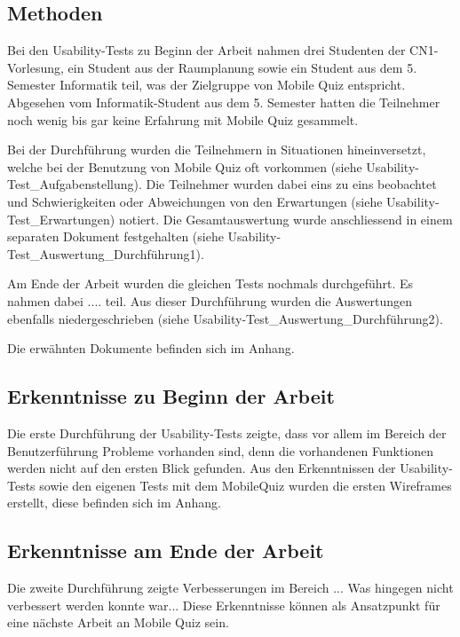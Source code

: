 \subsection{Methoden}
Bei den \gls{Usability-Tests} zu Beginn der Arbeit nahmen drei Studenten der \acrfull{CN1}-Vorlesung, ein Student aus der Raumplanung sowie ein Student aus dem 5. Semester Informatik teil, was der Zielgruppe von Mobile Quiz entspricht. Abgesehen vom Informatik-Student aus dem 5. Semester hatten die Teilnehmer noch wenig bis gar keine Erfahrung mit Mobile Quiz gesammelt.

Bei der Durchführung wurden die Teilnehmern in Situationen hineinversetzt, welche bei der Benutzung von Mobile Quiz oft vorkommen (siehe Usability-Test\_Aufgabenstellung). Die Teilnehmer wurden dabei eins zu eins beobachtet und Schwierigkeiten oder Abweichungen von den Erwartungen (siehe Usability-Test\_Erwartungen) notiert. Die Gesamtauswertung wurde anschliessend in einem separaten Dokument festgehalten (siehe Usability-Test\_Auswertung\_Durchführung1).

Am Ende der Arbeit wurden die gleichen Tests nochmals durchgeführt. Es nahmen dabei ....  teil. Aus dieser Durchführung wurden die Auswertungen ebenfalls niedergeschrieben (siehe Usability-Test\_Auswertung\_Durchführung2).

Die erwähnten Dokumente befinden sich im Anhang.


\subsection{Erkenntnisse zu Beginn der Arbeit}
Die erste Durchführung der \gls{Usability-Tests} zeigte, dass vor allem im Bereich der Benutzerführung Probleme vorhanden sind, denn die vorhandenen Funktionen werden nicht auf den ersten Blick gefunden.
Aus den Erkenntnissen der \gls{Usability-Tests} sowie den eigenen Tests mit dem MobileQuiz wurden die ersten \gls{Wireframes} erstellt, diese befinden sich im Anhang. 

\subsection{Erkenntnisse am Ende der Arbeit} 
Die zweite Durchführung zeigte Verbesserungen im Bereich ... 
Was hingegen nicht verbessert werden konnte war...
Diese Erkenntnisse können als Ansatzpunkt für eine nächste Arbeit an Mobile Quiz sein.



